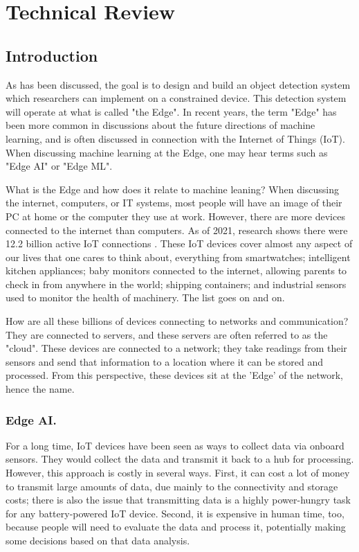 \documentclass{svproc}
\begin{document}
\section{Technical Review}
\subsection{Introduction}
As has been discussed, the goal is to design and build an object detection system which researchers can implement on a 
constrained device. This detection system will operate at what is called "the Edge". In recent years, the term "Edge" has 
been more common in discussions about the future directions of machine learning, and is often discussed in connection 
with the Internet of Things (IoT). When discussing machine learning at the Edge, one may hear terms such as "Edge AI" or "Edge ML".

What is the Edge and how does it relate to machine leaning? When discussing the internet, computers, or IT systems, 
most people will have an image of their PC at home or the computer they use at work. However, there are more devices 
connected to the internet than computers. As of 2021, research shows there were 12.2 billion active IoT connections \cite{b3}. 
These IoT devices cover almost any aspect of our lives that one cares to think about, everything from smartwatches; 
intelligent kitchen appliances; baby monitors connected to the internet, allowing parents to check in from anywhere in the world; 
shipping containers; and industrial sensors used to monitor the health of machinery. The list goes on and on.

How are all these billions of devices connecting to networks and communication? They are connected to servers, 
and these servers are often referred to as the "cloud". These devices are connected to a network; they take readings from their 
sensors and send that information to a location where it can be stored and processed. From this perspective, 
these devices sit at the 'Edge' of the network, hence the name.

\subsubsection{Edge AI.}
For a long time, IoT devices have been seen as ways to collect data via onboard sensors. They would collect the data and 
transmit it back to a hub for processing. However, this approach is costly in several ways. First, it can cost a lot of 
money to transmit large amounts of data, due mainly to the connectivity and storage costs; there is also the issue that transmitting 
data is a highly power-hungry task for any battery-powered IoT device. Second, it is expensive in human time, too, because 
people will need to evaluate the data and process it, potentially making some decisions based on that data analysis.
\end{document}

